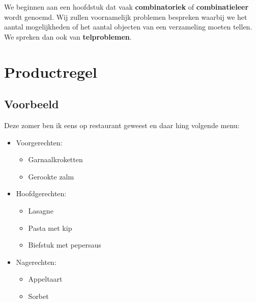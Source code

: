 \documentclass[12pt,a4paper,twoside]{article}
\begin{document}
\pagebreak
\begin{singlespacing}
  \scriptsize
  \tableofcontents
\end{singlespacing}
\thispagestyle{empty}

\pagebreak
{}

\pagestyle{fancy}
\fancyhead[RE,LO]{}

We beginnen aan een hoofdstuk dat vaak {\bf combinatoriek} of {\bf combinatieleer} wordt genoemd. Wij zullen voornamelijk problemen bespreken waarbij we het aantal mogelijkheden of het aantal objecten van een verzameling moeten tellen. We spreken dan ook van {\bf telproblemen}.


\section{Productregel}

\subsection{Voorbeeld}

Deze zomer ben ik eens op restaurant geweest en daar hing volgende menu:

\begin{center}
  \begin{minipage}{0.6\linewidth}
    \begin{mdframed}
      \begin{itemize}
      \item Voorgerechten:
        \begin{itemize}
        \item Garnaalkroketten
        \item Gerookte zalm
        \end{itemize}
      \item Hoofdgerechten:
        \begin{itemize}
        \item Lasagne
        \item Pasta met kip
        \item Biefstuk met pepersaus
        \end{itemize}
      \item Nagerechten:
        \begin{itemize}
        \item Appeltaart
        \item Sorbet
        \end{itemize}
      \end{itemize}
    \end{mdframed}
  \end{minipage}
\end{center}
\end{document}
